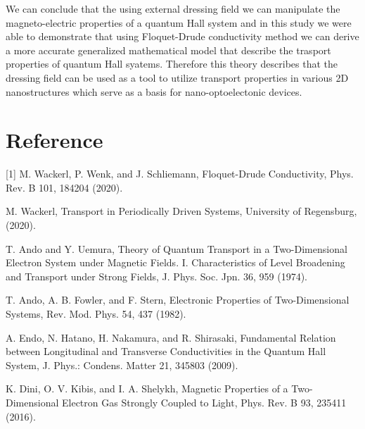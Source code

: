 \documentclass[a4paper]{article}
\numberwithin{equation}{subsection}
\numberwithin{equation}{section}
\begin{document}
We can conclude that the using external dressing field we can manipulate the magneto-electric properties of a quantum Hall system and in this study we were able to demonstrate that using Floquet-Drude conductivity method we can derive a more accurate generalized mathematical model that describe the trasport properties of quantum Hall syatems. Therefore this theory describes that the  dressing field can be used as a tool to utilize transport properties in various 2D nanostructures which serve as a basis for nano-optoelectonic devices.











\section*{Reference}


[1] M. Wackerl, P. Wenk, and J. Schliemann, Floquet-Drude Conductivity, Phys. Rev. B 101, 184204 (2020).

\noindent
[2] M. Wackerl, Transport in Periodically Driven Systems, University of Regensburg, (2020).

\noindent
[3] T. Ando and Y. Uemura, Theory of Quantum Transport in a Two-Dimensional Electron System under Magnetic Fields. I. Characteristics of Level Broadening and Transport under Strong Fields, J. Phys. Soc. Jpn. 36, 959 (1974).

\noindent
[4] T. Ando, A. B. Fowler, and F. Stern, Electronic Properties of Two-Dimensional Systems, Rev. Mod. Phys. 54, 437 (1982).

\noindent
[5] A. Endo, N. Hatano, H. Nakamura, and R. Shirasaki, Fundamental Relation between Longitudinal and Transverse Conductivities in the Quantum Hall System, J. Phys.: Condens. Matter 21, 345803 (2009).

\noindent
[6] K. Dini, O. V. Kibis, and I. A. Shelykh, Magnetic Properties of a Two-Dimensional Electron Gas Strongly Coupled to Light, Phys. Rev. B 93, 235411 (2016).
\end{document}

